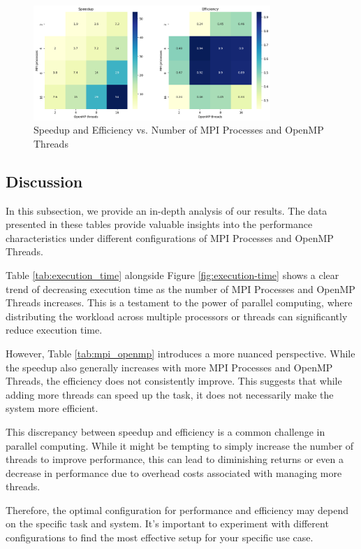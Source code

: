 \documentclass{solutionclass} %
\begin{document}
\begin{figure}[htbp]
    \centering
    \includegraphics[width=0.8\textwidth]{plot3}
    \caption{Speedup and Efficiency vs. Number of MPI Processes and OpenMP Threads}
    \label{fig:speedup-efficiency}
\end{figure}



\subsection{Discussion}
In this subsection, we provide an in-depth analysis of our results.
The data presented in these tables provide valuable insights into the performance characteristics under different configurations of MPI Processes and OpenMP Threads.

Table \ref{tab:execution_time} alongside Figure \ref{fig:execution-time} shows a clear trend of decreasing execution time as the number of MPI Processes and OpenMP Threads increases. This is a testament to the power of parallel computing, where distributing the workload across multiple processors or threads can significantly reduce execution time.

However, Table \ref{tab:mpi_openmp} introduces a more nuanced perspective. While the speedup also generally increases with more MPI Processes and OpenMP Threads, the efficiency does not consistently improve. This suggests that while adding more threads can speed up the task, it does not necessarily make the system more efficient.

This discrepancy between speedup and efficiency is a common challenge in parallel computing. While it might be tempting to simply increase the number of threads to improve performance, this can lead to diminishing returns or even a decrease in performance due to overhead costs associated with managing more threads.

Therefore, the optimal configuration for performance and efficiency may depend on the specific task and system. It's important to experiment with different configurations to find the most effective setup for your specific use case.
\end{document}
